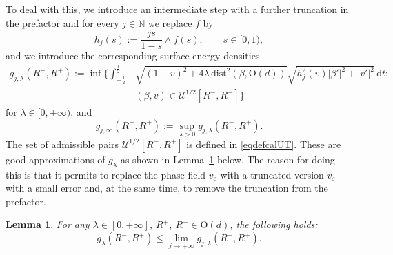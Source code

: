 \documentclass[a4paper,reqno]{amsart}
\newcommand\N{\mathbb{N}}
\newcommand\calU{\mathcal{U}}
\newcommand\tv{\widetilde{v}}
\newcommand\dist{{\mathrm{dist}}}
\newcommand\dt{{\,\mathrm{d}t}}
\newtheorem{lemma}[definition]{Lemma}
\theoremstyle{remark}
\def\e{\varepsilon}
\newcommand{\On}{\mathrm{O}(d)}
\numberwithin{equation}{section}
\begin{document}
To deal with this, we introduce an intermediate step with a further truncation in the prefactor
and
for every $j\in \N$ we replace $f$ by
\begin{equation}\label{0203241030}
h_j(s):=\frac{js}{1-s} \wedge f(s), \qquad s\in [0,1),
\end{equation}
 and we introduce the  corresponding surface energy densities
\begin{equation}\label{gbarlaj}
\begin{split}
{g}_{j,\lambda}( R^-, R^+) :=
\inf \bigg\{  \int_{-\frac 12}^{\frac 12} & \sqrt{(1-v)^2 + 4\lambda \, \dist^2(\beta, \On)} \sqrt{h_j^2(v) |\beta'|^2+|v'|^2} \dt\colon 
\\
&
(\beta,v) \in \calU^{1/2}[ R^-,R^+]  \bigg\}
\end{split}
\end{equation}
for $\lambda \in [0,+\infty)$, and 
\begin{equation}\label{gbarinfj}
	{g}_{j,\infty}( R^-, R^+) := \sup_{\lambda >0} {g}_{j,\lambda}( R^-, R^+).
\end{equation} 
The set of admissible pairs $ \calU^{1/2}[ R^-,R^+]$ is defined in \eqref{eqdefcalUT}. 
These are good approximations of $g_\lambda$ as shown in Lemma~\ref{p:approxg} below. The reason for doing this is that it permits to replace the phase field $v_\e$ with a truncated version $\tv_\e$ with a small error and, at the same time, to remove the truncation from the prefactor.





\begin{lemma}\label{p:approxg}
For  any $\lambda\in[0,+\infty]$, $R^+$, $ R^- \in \On$, the following holds:
	\begin{equation}\label{f:approxg}
	g_\lambda( R^-, R^+)\leq	\lim_{j\to +\infty}{g}_{j,\lambda}( R^-,R^+).
	\end{equation}
\end{lemma}
\end{document}
